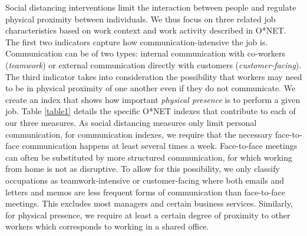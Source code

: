 Social distancing interventions limit the interaction between people and regulate physical proximity between individuals. We thus focus on three related job characteristics based on work context and work activity described in O*NET. The first two indicators capture how communication-intensive the job is. Communication can be of two types: internal communication with co-workers (\emph{teamwork}) or external communication directly with customers (\emph{customer-facing}). The third indicator takes into consideration the possibility that workers may need to be in physical proximity of one another even if they do not communicate. We create an index that shows how important \emph{physical presence} is to perform a given job. Table \ref{table1} details the specific O*NET indexes that contribute to each of our three measures.
As social distancing measures only limit personal communication, for communication indexes, we require that the necessary face-to-face communication happens at least several times a week. Face-to-face meetings can often be substituted by more structured communication, for which working from home is not as disruptive. To allow for this possibility, we only classify occupations as teamwork-intensive or customer-facing where both emails and letters and memos are less frequent forms of communication than face-to-face meetings. This excludes most managers and certain business services. Similarly, for physical presence, we require at least a certain degree of proximity to other workers which corresponds to working in a shared office.

